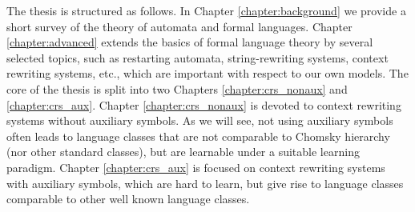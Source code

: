 The thesis is structured as follows. In Chapter \ref{chapter:background} we provide a short survey of the theory of automata and formal languages. Chapter \ref{chapter:advanced} extends the basics of formal language theory by several selected topics, such as restarting automata, string-rewriting systems, context rewriting systems, etc., which are important with respect to our own models. The core of the thesis is split into two Chapters \ref{chapter:crs_nonaux} and \ref{chapter:crs_aux}. Chapter \ref{chapter:crs_nonaux} is devoted to context rewriting systems without auxiliary symbols. As we will see, not using auxiliary symbols often leads to language classes that are not comparable to Chomsky hierarchy (nor other standard classes), but are learnable under a suitable learning paradigm. Chapter \ref{chapter:crs_aux} is focused on context rewriting systems with auxiliary symbols, which are hard to learn, but give rise to language classes comparable to other well known language classes.